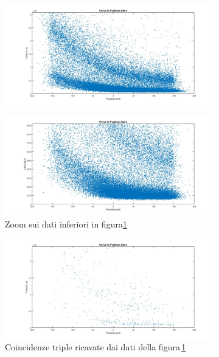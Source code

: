 \documentclass[a4paper,twocolumn]{article}
\begin{document}
\begin{figure}[H]
\begin{subfigure}[b]{0.45\textwidth}
\includegraphics[width=\textwidth]{./immagini/TimeOfFlight/AttenuazioneDoppia.jpg}
\caption{}
\label{fig:AttenuazioneDoppia}
\end{subfigure}
\hfill
\begin{subfigure}[b]{0.45\textwidth}
\includegraphics[width=\textwidth]{./immagini/TimeOfFlight/AttenuazioneDoppiaZoom.jpg}
\caption{Zoom sui dati inferiori in figura\ref{fig:AttenuazioneDoppia}}
\label{fig:AttenuazioneDoppiaZoom}
\end{subfigure}
\hfill
\begin{subfigure}[b]{0.45\textwidth}
\includegraphics[width=\textwidth]{./immagini/TimeOfFlight/AttenuazioneTripla.jpg}
\caption{Coincidenze triple ricavate dai dati della figura\,\ref{fig:AttenuazioneDoppia}}
\label{fig:AttenuazioneTripla}
\end{subfigure}
\caption{}
\end{figure}
\end{document}
